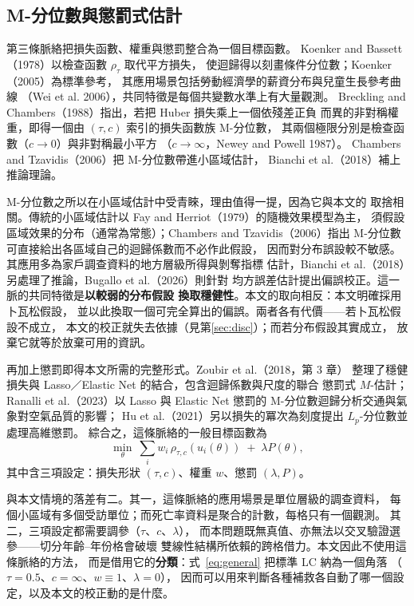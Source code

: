 \documentclass[UTF8, fontset=macnew, a4paper, 12pt]{ctexart}
\begin{document}
\subsection{M-分位數與懲罰式估計}

第三條脈絡把損失函數、權重與懲罰整合為一個目標函數。
Koenker and Bassett（1978）以檢查函數 $\rho_\tau$ 取代平方損失，
使迴歸得以刻畫條件分位數；Koenker（2005）為標準參考，
其應用場景包括勞動經濟學的薪資分布與兒童生長參考曲線
（Wei et al. 2006），共同特徵是每個共變數水準上有大量觀測。
Breckling and Chambers（1988）指出，若把 Huber 損失乘上一個依殘差正負
而異的非對稱權重，即得一個由 $(\tau,c)$ 索引的損失函數族 M-分位數，
其兩個極限分別是檢查函數（$c\to0$）與非對稱最小平方
（$c\to\infty$，Newey and Powell 1987）。
Chambers and Tzavidis（2006）把 M-分位數帶進小區域估計，
Bianchi et al.（2018）補上推論理論。

M-分位數之所以在小區域估計中受青睞，理由值得一提，因為它與本文的
取捨相關。傳統的小區域估計以 Fay and Herriot（1979）的隨機效果模型為主，
須假設區域效果的分布（通常為常態）；Chambers and Tzavidis（2006）指出
M-分位數可直接給出各區域自己的迴歸係數而不必作此假設，
因而對分布誤設較不敏感。其應用多為家戶調查資料的地方層級所得與剝奪指標
估計，Bianchi et al.（2018）另處理了推論，Bugallo et al.（2026）則針對
均方誤差估計提出偏誤校正。這一脈的共同特徵是\textbf{以較弱的分布假設
換取穩健性}。本文的取向相反：本文明確採用卜瓦松假設，
並以此換取一個可完全算出的偏誤。兩者各有代價——若卜瓦松假設不成立，
本文的校正就失去依據（見第\ref{sec:disc}）；而若分布假設其實成立，
放棄它就等於放棄可用的資訊。

再加上懲罰即得本文所需的完整形式。Zoubir et al.（2018，第 3 章）
整理了穩健損失與 Lasso／Elastic Net 的結合，包含迴歸係數與尺度的聯合
懲罰式 $M$-估計；Ranalli et al.（2023）以 Lasso 與 Elastic Net 懲罰的
M-分位數迴歸分析交通與氣象對空氣品質的影響；
Hu et al.（2021）另以損失的冪次為刻度提出 $L_p$-分位數並處理高維懲罰。
綜合之，這條脈絡的一般目標函數為
\begin{equation}\label{eq:general}
\min_{\theta}\ \sum_{i} w_i\,\rho_{\tau,c}(u_i(\theta))\;+\;\lambda P(\theta),
\end{equation}
其中含三項設定：損失形狀 $(\tau,c)$、權重 $w$、懲罰 $(\lambda,P)$。

與本文情境的落差有二。其一，這條脈絡的應用場景是單位層級的調查資料，
每個小區域有多個受訪單位；而死亡率資料是聚合的計數，每格只有一個觀測。
其二，三項設定都需要調參（$\tau$、$c$、$\lambda$），
而本問題既無真值、亦無法以交叉驗證選參——切分年齡--年份格會破壞
雙線性結構所依賴的跨格借力。本文因此不使用這條脈絡的方法，
而是借用它的\textbf{分類}：式~\eqref{eq:general} 把標準 LC 納為一個角落
（$\tau=0.5$、$c=\infty$、$w\equiv1$、$\lambda=0$），
因而可以用來判斷各種補救各自動了哪一個設定，以及本文的校正動的是什麼。
\end{document}
